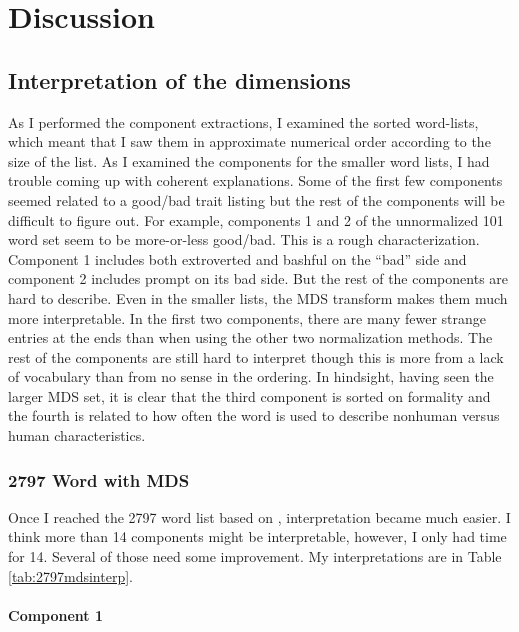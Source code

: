 \documentclass[eric_thesis.tex]{subfiles}
\begin{document}
\chapter{Discussion}

\section{Interpretation of the dimensions}

As I performed the component extractions, I examined the sorted word-lists, 
which meant that I saw them in approximate numerical order according to the size 
of the list. As I examined the components for the smaller word lists, I had 
trouble coming up with coherent explanations. Some of the first few components 
seemed related to a good/bad trait listing but the rest of the components will 
be difficult to figure out. For example, components 1 and 2 of the unnormalized 
101 word set seem to be more-or-less good/bad. This is a rough characterization. 
Component 1 includes both extroverted and bashful on the ``bad'' side and 
component 2 includes prompt on its bad side. But the rest of the components are 
hard to describe. Even in the smaller lists, the MDS transform makes them much 
more interpretable. In the first two components, there are many fewer strange 
entries at the ends than when using the other two normalization methods. The 
rest of the components are still hard to interpret though this is more from a 
lack of vocabulary than from no sense in the ordering. In hindsight, having seen 
the larger MDS set, it is clear that the third component is sorted on formality 
and the fourth is related to how often the word is used to describe nonhuman 
versus human characteristics. 

\subsection{2797 Word with MDS}

Once I reached the 2797 word list based on \citep{Norman1967}, interpretation 
became much easier. I think more than 14 components might be interpretable, 
however, I only had time for 14. Several of those need some improvement. 
My interpretations are in Table
\ref{tab:2797mdsinterp}.

\subsubsection{Component 1}
\end{document}
